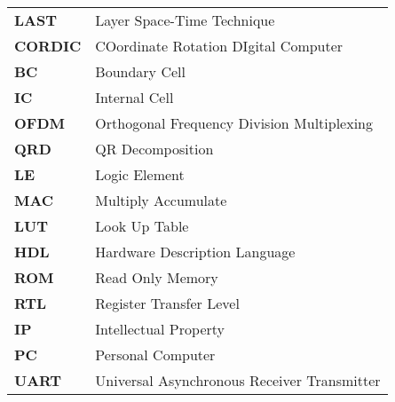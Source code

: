 \begin{longtable}{ll}
\textbf{LAST}   & Layer Space-Time Technique                  \\
\textbf{CORDIC} & COordinate Rotation DIgital Computer        \\
\textbf{BC}     & Boundary Cell                               \\
\textbf{IC}     & Internal Cell                               \\
\textbf{OFDM}   & Orthogonal Frequency Division Multiplexing  \\
\textbf{QRD}    & QR Decomposition                            \\
\textbf{LE}     & Logic Element                               \\
\textbf{MAC}    & Multiply Accumulate                         \\
\textbf{LUT}    & Look Up Table                               \\
\textbf{HDL}    & Hardware Description Language               \\
\textbf{ROM}    & Read Only Memory                            \\
\textbf{RTL}    & Register Transfer Level                     \\
\textbf{IP}     & Intellectual Property                       \\
\textbf{PC}     & Personal Computer                           \\
\textbf{UART}   & Universal Asynchronous Receiver Transmitter \\
\end{longtable}
